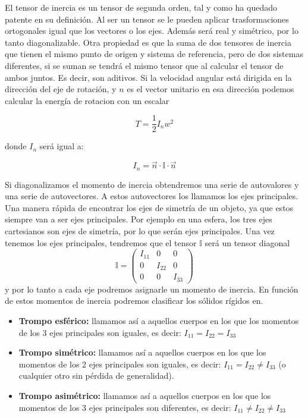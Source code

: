 \documentclass[12pt,a4paper]{book}
\begin{document}
El tensor de inercia es un tensor de segunda orden, tal y como ha quedado patente en su definición. Al ser un tensor se le pueden aplicar trasformaciones ortogonales igual que los vectores o los ejes. Además será real y simétrico, por lo tanto diagonalizable. Otra propiedad es que la suma de dos tensores de inercia que tienen el mismo punto de origen y sistema de referencia, pero de dos sistemas diferentes, si se suman se tendrá el mismo tensor que al calcular el tensor de ambos juntos. Es decir, son aditivos. Si la velocidad angular está dirigida en la dirección del eje de rotación, y $n$ es el vector unitario en esa dirección podemos calcular la energía de rotacion con un escalar

\begin{equation}
T = \dfrac{1}{2} I_n w^2
\end{equation}

donde $I_n$ será igual a:

\begin{equation}
I_n = \vec{n} \cdot \mathbb{I} \cdot \vec{n}
\end{equation}

Si diagonalizamos el momento de inercia obtendremos una serie de autovalores y una serie de autovectores. A estos autovectores los llamamos los ejes principales. Una manera rápida de encontrar los ejes de simetría de un objeto, ya que estos siempre van a ser ejes principales. Por ejemplo en una esfera, los tres ejes cartesianos son ejes de simetría, por lo que serán ejes principales. Una vez tenemos los ejes principales, tendremos que el tensor $\mathbb{I}$ será un tensor diagonal $$ \mathbb{I} = \begin{pmatrix}
I_{ 1 1 }  &
0  &
0 \\ 
0  &
I_{ 2 2 }  &
0 \\ 
0  &
0  &
I_{ 3 3 }  
\end{pmatrix} $$ y por lo tanto a cada eje podremos asignarle un momento de inercia. En función de estos momentos de inercia podremos clasificar los sólidos rígidos en.

\begin{itemize}
\item \textbf{Trompo esférico:} llamamos así a aquellos cuerpos en los que los momentos de los 3 ejes principales son iguales, es decir:  $I_{11} = I_{22} = I_{33}$ 
\item \textbf{Trompo simétrico:} llamamos así a aquellos cuerpos en los que los momentos de los 2 ejes principales son iguales, es decir:  $I_{11} = I_{22} \neq I_{33}$ (o cualquier otro sin pérdida de generalidad).
\item \textbf{Trompo asimétrico:} llamamos así a aquellos cuerpos en los que los momentos de los 3 ejes principales son diferentes, es decir:  $I_{11} \neq I_{22} \neq I_{33}$ 
\end{itemize}
\end{document}
